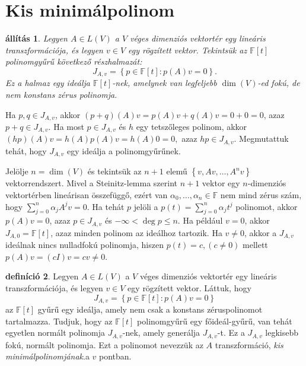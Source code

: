 \documentclass[a4paper, showtrims]{memoir}
\makeatletter
\renewenvironment{proof}[1][\proofname]
    {\par\pushQED{\qed}%
    \normalfont \topsep6\p@\@plus6\p@\relax
    \trivlist
    \item[\hskip\labelsep
        \itshape
    #1\@addpunct{:}]\ignorespaces}
    {\popQED\endtrivlist\@endpefalse}
\theoremstyle{plain}
\newtheorem{proposition}{állítás}[chapter]
\theoremstyle{remark}
\theoremstyle{definition}
\newtheorem{definition}[proposition]{definíció}
\makeatother
\begin{document}
\section{Kis minimálpolinom}
\begin{proposition}
	Legyen $A\in L\left( V \right)$ a $V$ véges dimenziós vektortér egy lineáris transzformációja,
	és legyen $v\in V$ egy rögzített vektor.
	Tekintsük az
	$\mathbb{F}\left[ t \right]$ polinomgyűrű következő részhalmazát:
	\[
		J_{A,v}
		=
		\left\{ p\in\mathbb{F}\left[ t \right]:p\left( A \right)v=0 \right\}.
	\]
	Ez a halmaz egy ideálja $\mathbb{F}\left[ t \right]$-nek,
	amelynek van legfeljebb $\dim(V)$-ed fokú, de nem konstans zérus polinomja.
\end{proposition}
\begin{proof}
	Ha $p,q\in J_{A,v}$,
	akkor
	$\left( p+q \right)(A)v=p\left( A \right)v+q\left( A \right)v=0+0=0$,
	azaz $p+q\in J_{A,v}$.
	Ha most $p\in J_{A,v}$ és $h$ egy tetszőleges polinom,
	akkor
	$
		\left( hp \right)(A)v=h\left( A \right)p\left( A \right)v=h\left( A \right)0=0,
	$
	azaz $hp\in J_{A,v}$.
	Megmutattuk tehát, hogy $J_{A,v}$ egy ideálja a polinomgyűrűnek.

	Jelölje $n=\dim(V)$ és tekintsük az $n+1$ elemű
	$\left\{ v,Av,\ldots,A^nv \right\}$ vektorrendszert.
	Mivel a Steinitz-lemma szerint 
	$n+1$ vektor egy $n$-dimenziós vektortérben lineárisan összefüggő,
	ezért van
	$\alpha_0,\ldots,\alpha_n\in\mathbb{F}$ nem mind zérus szám, hogy
	$\sum_{j=0}^n\alpha_jA^jv=0$.
	Ha tehát $p$ jelöli a $p\left( t \right)=\sum_{j=0}^n\alpha_jt^j$ polinomot,
	akkor
	$p\left( A \right)v=0$, azaz $p\in J_{A,v}$ és $-\infty<\deg p\leq n$.
\end{proof}
Ha például $v=0$, akkor $J_{A,0}=\mathbb{F}\left[ t \right]$, azaz minden polinom
az ideálhoz tartozik.
Ha $v\neq 0$,
akkor a $J_{A,v}$ ideálnak nincs nulladfokú polinomja,
hiszen $p(t)=c, (c\neq 0)$ mellett
$p\left( A \right)v=(cI)v=cv\neq 0$.

\begin{definition}
	Legyen $A\in L\left( V \right)$ a $V$ véges dimenziós vektortér egy lineáris transzformációja,
	és legyen $v\in V$ egy rögzített vektor.
	Láttuk, hogy
	\[
		J_{A,v}
		=
		\left\{ p\in\mathbb{F}\left[ t \right]:p\left( A \right)v=0 \right\}
	\]
	az $\mathbb{F}\left[ t \right]$ gyűrű egy ideálja, amely nem csak a konstans zéruspolinomot tartalmazza.
	Tudjuk, hogy az $\mathbb{F}\left[ t \right]$ polinomgyűrű egy főideál-gyűrű,
	van tehát egyetlen normált polinomja $J_{A,v}$-nek, amely generálja $J_{A,v}$-t.
	Ez a $J_{A,v}$ legkisebb fokú, normált polinomja.
	Ezt a polinomot nevezzük az $A$ transzformáció, 
    \emph{kis minimálpolinomjának}.\label{def:kisminimal}
    a $v$ pontban.
\end{definition}
\end{document}
